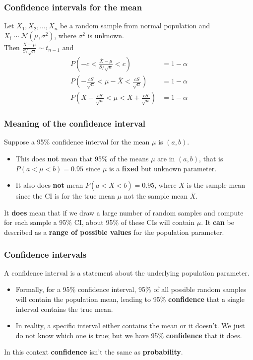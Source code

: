 \documentclass[a4paper]{article}
\begin{document}
\subsubsection{Confidence intervals for the mean}
Let \( X_1,X_2,\dotsc,X_n \) be a random sample from normal population and \( X_i \sim \mathcal{N}(\mu,\sigma^2) \), where \( \sigma^2 \) is unknown.\\
Then \( \frac{\overline{X} - \mu}{S / \sqrt{n}} \sim t_{n-1} \) and
\begin{align*}
	P \left( -c < \frac{\overline{X} - \mu}{S / \sqrt{n}} < c \right) &= 1 - \alpha\\
	P \left(-\frac{cS}{\sqrt{n}} < \mu - \overline{X} < \frac{cS}{\sqrt{n}}\right) &= 1-\alpha\\
	P \left(\overline{X} - \frac{cS}{\sqrt{n}} < \mu < \overline{X} + \frac{cS}{\sqrt{n}} \right) &= 1-\alpha
\end{align*}
\subsubsection{Meaning of the confidence interval}
Suppose a 95\% confidence interval for the mean \( \mu \) is \( (a,b) \).
\begin{itemize}
	\item This \textcolor{myred}{does \textbf{not}} mean that 95\% of the means \( \mu \) are in \( (a,b) \), that is \( P(a < \mu < b) = 0.95 \) since \( \mu \) is a \textbf{fixed} but unknown parameter.
	\item It also \textcolor{myred}{does \textbf{not}} mean \( P(a < \overline{X} < b) = 0.95 \), where \( \overline{X} \) is the sample mean since the CI is for the true mean \( \mu \) not the sample mean \( \overline{X} \).
\end{itemize}
It \textcolor{myred}{\textbf{\textbf{does}}} mean that if we draw a large number of random samples and compute for each sample a 95\% CI, about 95\% of these CIs will contain \( \mu \).
It \textbf{can} be described as a \textcolor{mygreen}{\textbf{range of possible values}} for the population parameter.
\subsubsection{Confidence intervals}
A confidence interval is a statement about the underlying population parameter.
\begin{itemize}
	\item Formally, for a 95\% confidence interval, 95\% of all possible random samples will contain the population mean, leading to 95\% \textcolor{myred}{\textbf{confidence}} that a single interval contains the true mean.
	\item In reality, a specific interval either contains the mean or it doesn't. We just do not know which one is true; but we have 95\% \textcolor{myred}{\textbf{confidence}} that it does.
\end{itemize}
In this context \textcolor{myred}{\textbf{confidence}} isn't the same as \textcolor{mygreen}{\textbf{probability}}.
\end{document}
